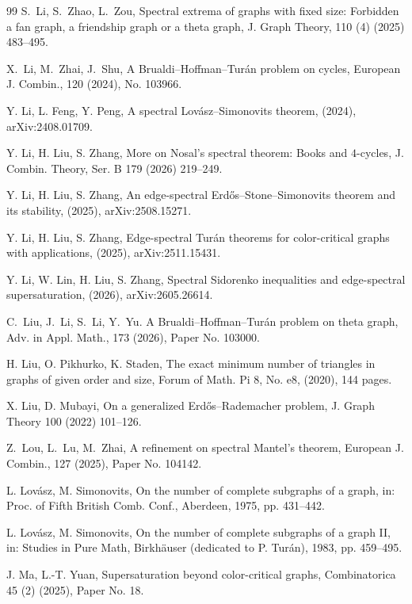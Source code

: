 \documentclass[11pt,a4paper]{article}
\theoremstyle{definition}
\theoremstyle{plain}
\begin{document}
\begin{thebibliography}{99}
S.~Li, S.~Zhao, L.~Zou, 
Spectral extrema of graphs with fixed size: {Forbidden} a fan graph, a friendship graph or a theta graph, 
{J. Graph Theory}, 110 (4) (2025) 483--495.

X.~Li, M.~Zhai, J.~Shu, 
A {Brualdi--Hoffman--Tur\'{a}n} problem on cycles, 
{European J. Combin.}, 120 (2024), No. 103966.  

Y. Li, L. Feng, Y. Peng,
{A spectral Lov\'{a}sz--Simonovits theorem}, 
(2024), arXiv:2408.01709.

Y. Li, H. Liu, S. Zhang,
More on Nosal's spectral theorem: Books and $4$-cycles,
{J. Combin. Theory, Ser. B} {179} (2026) 219--249.

Y. Li, H. Liu, S. Zhang, 
An edge-spectral Erd\H{o}s--Stone--Simonovits theorem and its stability, 
 (2025), arXiv:2508.15271. 


Y. Li, H. Liu, S. Zhang, 
 Edge-spectral Tur\'{a}n theorems for color-critical graphs with applications, 
 (2025), arXiv:2511.15431. 
 
 Y. Li, W. Lin, H. Liu, S. Zhang, 
 Spectral Sidorenko inequalities and 
 edge-spectral supersaturation, (2026), arXiv:2605.26614. 
 
C.~Liu, J.~Li, S.~Li, Y.~Yu.
A {Brualdi--Hoffman--Tur\'{a}n} problem on theta graph, 
{Adv. in Appl. Math.}, 173 (2026), 
Paper No. 103000. 


H. Liu, O. Pikhurko, K. Staden, 
The exact minimum number of triangles in graphs of given order and size, 
Forum of Math. Pi 8, No. e8, (2020), 144 pages. 


X. Liu, D. Mubayi, 
On a generalized Erd\H{o}s--Rademacher problem, 
J. Graph Theory 100 (2022) 101--126. 
 
 
Z.~Lou, L.~Lu, M.~Zhai, 
A refinement on spectral {Mantel's} theorem, 
{European J. Combin.}, 127 (2025), Paper No. 104142.

L. Lov\'{a}sz, M. Simonovits,
On the number of complete subgraphs of a graph,
in: Proc. of Fifth British Comb. Conf., Aberdeen, 1975,
pp. 431--442.


L. Lov\'{a}sz, M. Simonovits,
On the number of complete subgraphs of a graph II,
in: Studies in Pure Math, Birkh\"{a}user (dedicated to P. Tur\'{a}n), 1983,
pp. 459--495. 

J. Ma, L.-T. Yuan, Supersaturation beyond color-critical graphs, 
Combinatorica 45 (2) (2025), Paper No. 18. 


\end{thebibliography}
\end{document}
